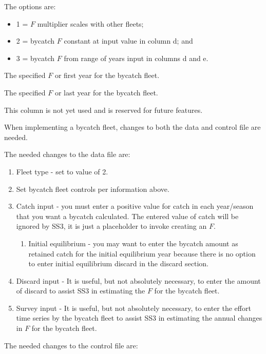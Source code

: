 The options are:  
  \begin{itemize}
  	\item 1 = $F$ multiplier scales with other fleets;
  	\item 2 = bycatch $F$ constant at input value in column d; and
  	\item 3 = bycatch $F$ from range of years input in columns d and e.
  \end{itemize}

The specified $F$ or first year for the bycatch fleet.

The specified $F$ or last year for the bycatch fleet.

This column is not yet used and is reserved for future features.

When implementing a bycatch fleet, changes to both the data and control file are needed.  

The needed changes to the data file are:

\begin{enumerate}
	\item Fleet type - set to value of 2.
	\item Set bycatch fleet controls per information above.
	\item Catch input - you must enter a positive value for catch in each year/season that you want a bycatch calculated. The entered value of catch will be ignored by SS3, it is just a placeholder to invoke creating an $F$.
	\begin{enumerate}
		\item Initial equilibrium - you may want to enter the bycatch amount as retained catch for the initial equilibrium year because there is no option to enter initial equilibrium discard in the discard section.
	\end{enumerate}	
	\item Discard input - It is useful, but not absolutely necessary, to enter the amount of discard to assist SS3 in estimating the $F$ for the bycatch fleet.
	\item Survey input - It is useful, but not absolutely necessary, to enter the effort time series by the bycatch fleet to assist SS3 in estimating the annual changes in $F$ for the bycatch fleet.
\end{enumerate}

The needed changes to the control file are:

